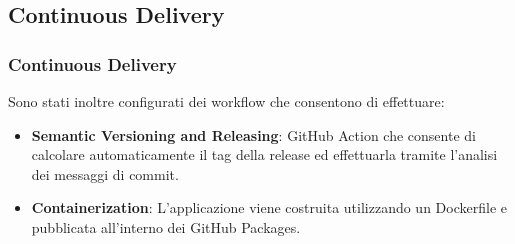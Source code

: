 
\subsection{Continuous Delivery}
\begin{frame}
    \frametitle{Continuous Delivery}
    Sono stati inoltre configurati dei workflow che consentono di effettuare:
    \begin{itemize}
        \item \textbf{Semantic Versioning and Releasing}: GitHub Action che consente di calcolare automaticamente il tag della release ed effettuarla tramite l'analisi dei messaggi di commit.
        \item \textbf{Containerization}: L'applicazione viene costruita utilizzando un Dockerfile e pubblicata all'interno dei GitHub Packages.
    \end{itemize}
\end{frame}



